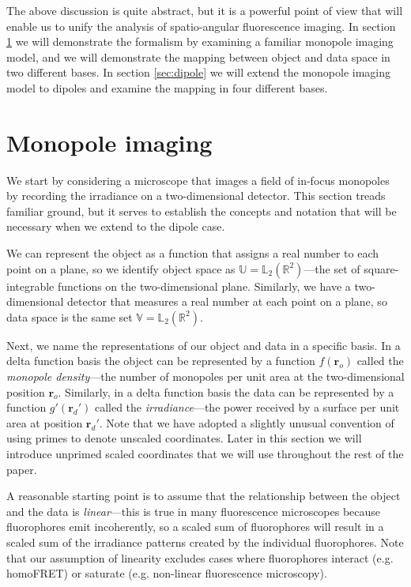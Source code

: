 \documentclass[]{osa-article}
\providecommand{\ro}{\mathbf{\mathbf{r}}_o}
\providecommand{\rd}{\mathbf{r}_d}
\providecommand{\mbb}[1]{\mathbb{#1}}
\begin{document}
The above discussion is quite abstract, but it is a powerful point of view that
will enable us to unify the analysis of spatio-angular fluorescence imaging.
In section \ref{sec:monopole} we will demonstrate the formalism by examining a
familiar monopole imaging model, and we will demonstrate the mapping between
object and data space in two different bases. In section \ref{sec:dipole} we
will extend the monopole imaging model to dipoles and examine the mapping in
four different bases.

\section{Monopole imaging}\label{sec:monopole}
We start by considering a microscope that images a field of in-focus monopoles
by recording the irradiance on a two-dimensional detector. This section treads
familiar ground, but it serves to establish the concepts and notation that will
be necessary when we extend to the dipole case.

We can represent the object as a function that assigns a real number to each
point on a plane, so we identify object space as
$\mbb{U} = \mbb{L}_2(\mbb{R}^2)$---the set of square-integrable functions on the
two-dimensional plane. Similarly, we have a two-dimensional detector that
measures a real number at each point on a plane, so data space is the same set
$\mbb{V} = \mbb{L}_2(\mbb{R}^2)$.

Next, we name the representations of our object and data in a specific basis. In
a delta function basis the object can be represented by a function $f(\ro)$
called the \textit{monopole density}---the number of monopoles per unit area at
the two-dimensional position $\ro$. Similarly, in a delta function basis the
data can be represented by a function $g'(\rd')$ called the
\textit{irradiance}---the power received by a surface per unit area at position
$\rd'$. Note that we have adopted a slightly unusual convention of using primes
to denote unscaled coordinates. Later in this section we will introduce unprimed
scaled coordinates that we will use throughout the rest of the
paper.

A reasonable starting point is to assume that the relationship between the
object and the data is \textit{linear}---this is true in many fluorescence
microscopes because fluorophores emit incoherently, so a scaled sum of
fluorophores will result in a scaled sum of the irradiance patterns created by
the individual fluorophores. Note that our assumption of linearity excludes
cases where fluorophores interact (e.g. homoFRET) or saturate (e.g. non-linear
fluorescence microscopy).
\end{document}
